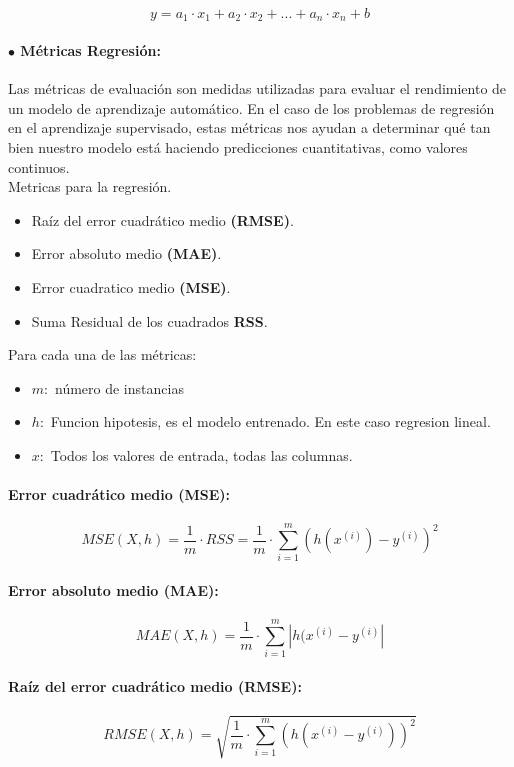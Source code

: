 \documentclass[../main.tex]{subfiles}
\begin{document}
		\begin{equation}
			y = a_1 \cdot x_1 + a_2 \cdot x_2 + ... + a_n \cdot x_n + b
		\end{equation}
		
		\paragraph{$\bullet$ Métricas Regresión:}
                Las métricas de evaluación son medidas utilizadas para evaluar el rendimiento de un modelo de aprendizaje automático. En el caso de los problemas de regresión en el aprendizaje supervisado, estas métricas nos ayudan a determinar qué tan bien nuestro modelo está haciendo predicciones cuantitativas, como valores continuos.\\
		
    		Metricas para la regresión.
    		\begin{itemize}
    			\item Raíz del error cuadrático medio \textbf{(RMSE)}.
    			\item Error absoluto medio \textbf{(MAE)}.
    			\item Error cuadratico medio \textbf{(MSE)}.
    			\item Suma Residual de los cuadrados \textbf{RSS}.
    		\end{itemize}
		
    		Para cada una de las métricas:
    		\begin{itemize}
    			\item $m:$ número de instancias
    			\item $h:$ Funcion hipotesis, es el modelo entrenado. En este caso regresion lineal.
    			\item $x:$ Todos los valores de entrada, todas las columnas.
    		\end{itemize}
    		
    		\paragraph{Error cuadrático medio \textbf{(MSE)}:}
    		\begin{equation}
    			MSE(X, h) = \frac{1}{m} \cdot RSS = \frac{1}{m} \cdot \sum_{i=1}^{m} (h(x^{(i)}) - y^{(i)})^2
    		\end{equation}
    		
    		\paragraph{Error absoluto medio \textbf{(MAE)}:}
    		\begin{equation}
    			MAE(X, h) = \frac{1}{m} \cdot \sum_{i=1}^{m} |h(x^{(i)} - y^{(i)}|
    		\end{equation}
    		
    		\paragraph{Raíz del error cuadrático medio \textbf{(RMSE)}:}
    		\begin{equation}
    			RMSE(X, h) = \sqrt{\frac{1}{m} \cdot \sum_{i=1}^{m}(h(x^{(i)}-y^{(i)}))^2}
    		\end{equation}
		          
\end{document}
